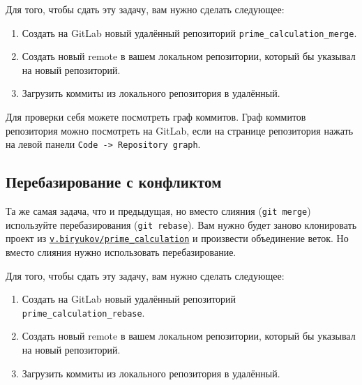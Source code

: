 \documentclass{article}
\begin{document}
\noindent Для того, чтобы сдать эту задачу, вам нужно сделать следующее:
\begin{enumerate}
\item Создать на GitLab новый удалённый репозиторий \texttt{prime\_calculation\_merge}.
\item Создать новый remote в вашем локальном репозитории, который бы указывал на новый репозиторий.
\item Загрузить коммиты из локального репозитория в удалённый.
\end{enumerate}

\noindent Для проверки себя можете посмотреть граф коммитов. Граф коммитов репозитория можно посмотреть на GitLab, если на странице репозитория нажать на левой панели \texttt{Code -> Repository graph}.

\subsection{Перебазирование с конфликтом}
Та же самая задача, что и предыдущая, но вместо слияния (\texttt{git merge}) используйте перебазирования (\texttt{git rebase}). Вам нужно будет заново клонировать проект из \href{https://mipt-hsse.gitlab.yandexcloud.net/v.biryukov/prime_calculation}{\texttt{v.biryukov/prime\_calculation}} и произвести объединение веток. Но вместо слияния нужно использовать перебазирование.

\noindent Для того, чтобы сдать эту задачу, вам нужно сделать следующее:
\begin{enumerate}
\item Создать на GitLab новый удалённый репозиторий \texttt{prime\_calculation\_rebase}.
\item Создать новый remote в вашем локальном репозитории, который бы указывал на новый репозиторий.
\item Загрузить коммиты из локального репозитория в удалённый.
\end{enumerate}
\end{document}
